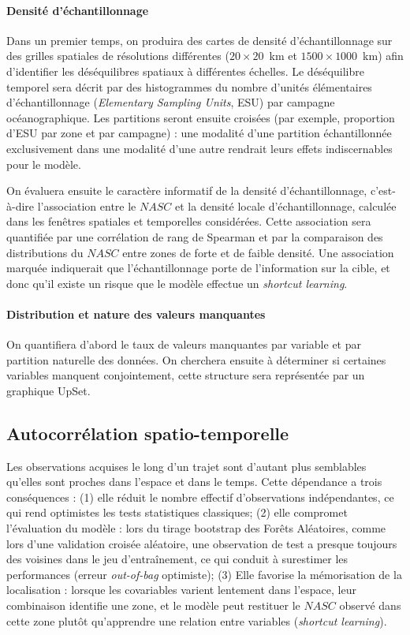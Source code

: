 \paragraph{Densité d'échantillonnage}
Dans un premier temps, on produira des cartes de densité d'échantillonnage sur des grilles spatiales de résolutions différentes ($20 \times 20$~km et $1500 \times 1000$~km) afin d'identifier les déséquilibres spatiaux à différentes échelles. Le déséquilibre temporel sera décrit par des histogrammes du nombre d'unités élémentaires d'échantillonnage (\textit{Elementary Sampling Units}, ESU) par campagne océanographique. Les partitions seront ensuite croisées (par exemple, proportion d'ESU par zone et par campagne) : une modalité d'une partition échantillonnée exclusivement dans une modalité d'une autre rendrait leurs effets indiscernables pour le modèle.

On évaluera ensuite le caractère informatif de la densité d'échantillonnage, c'est-à-dire l'association entre le $NASC$ et la densité locale d'échantillonnage, calculée dans les fenêtres spatiales et temporelles considérées. Cette association sera quantifiée par une corrélation de rang de Spearman et par la comparaison des distributions du $NASC$ entre zones de forte et de faible densité. Une association marquée indiquerait que l'échantillonnage porte de l'information sur la cible, et donc qu'il existe un risque que le modèle effectue un \textit{shortcut learning}.

\paragraph{Distribution et nature des valeurs manquantes}
On quantifiera d'abord le taux de valeurs manquantes par variable et par partition naturelle des données. On cherchera ensuite à déterminer si certaines variables manquent conjointement, cette structure sera représentée par un graphique UpSet.

\subsection{Autocorrélation spatio-temporelle}
\label{subsection:autocorrelation}
Les observations acquises le long d'un trajet sont d'autant plus semblables qu'elles sont proches dans l'espace et dans le temps. Cette dépendance a trois conséquences : (1) elle réduit le nombre effectif d'observations indépendantes, ce qui rend optimistes les tests statistiques classiques; (2) elle compromet l'évaluation du modèle : lors du tirage bootstrap des Forêts Aléatoires, comme lors d'une validation croisée aléatoire, une observation de test a presque toujours des voisines dans le jeu d'entraînement, ce qui conduit à surestimer les performances (erreur \textit{out-of-bag} optimiste); (3) Elle favorise la mémorisation de la localisation : lorsque les covariables varient lentement dans l'espace, leur combinaison identifie une zone, et le modèle peut restituer le $NASC$ observé dans cette zone plutôt qu'apprendre une relation entre variables (\textit{shortcut learning}).

